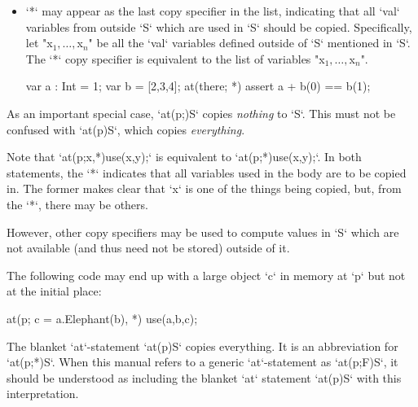 \begin{itemize}
\item \xcd`*` may appear as the last copy specifier in the list, indicating
      that all \xcd`val` variables from outside \xcd`S` which are used in
      \xcd`S` should be copied. Specifically, let 
      \xcdmath"x$_1, \ldots, $x$_n$" be all the \xcd`val` variables defined
      outside of \xcd`S` 
      mentioned in \xcd`S`. The \xcd`*` copy specifier is equivalent to 
      the list of variables 
      \xcdmath"x$_1, \ldots, $x$_n$".

\begin{ex}
\begin{xten}
var a : Int = 1;
var b = [2,3,4];
at(there; *) {
  assert a + b(0) == b(1);
}
\end{xten}
% 
\end{ex}

\end{itemize}

As an important special case, \xcd`at(p;)S` copies {\em nothing} to \xcd`S`.
This must not be confused with \xcd`at(p)S`, which copies {\em everything}.



Note that \xcd`at(p;x,*)use(x,y);` is equivalent to \xcd`at(p;*)use(x,y);`.
In both statements, the \xcd`*` indicates that all variables used in the body
are to be copied in.  The former makes clear that \xcd`x` is one of the things
being copied, but, from the \xcd`*`, there may be others. 

However, other copy specifiers may be used to compute
values in \xcd`S` which are not available (and thus need not be stored)
outside of it.  

\begin{ex}The following code may end up with a large object \xcd`c` in
memory at \xcd`p` but not at the initial place: 
\begin{xten}
at(p; c = a.Elephant(b), *) {
  use(a,b,c);
}
\end{xten}
\end{ex}

The blanket \xcd`at`-statement \xcd`at(p)S` copies everything.  It is an
abbreviation for \xcd`at(p;*)S`.  
When this manual refers to a generic \xcd`at`-statement as \xcd`at(p;F)S`, it
should be understood as including the blanket \xcd`at` statement \xcd`at(p)S`
with this interpretation.



